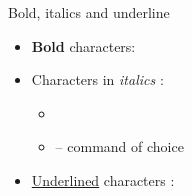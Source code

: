 \begin{frame}[c]{Bold, italics and underline}
	\begin{itemize}
		\item \textbf{Bold} characters: 
		\item Characters in \emph{italics} :
		\begin{itemize}
			\item {}
			\item {} -- command of choice
		\end{itemize}
		\item \underline{Underlined} characters : 
	\end{itemize}
\end{frame}

